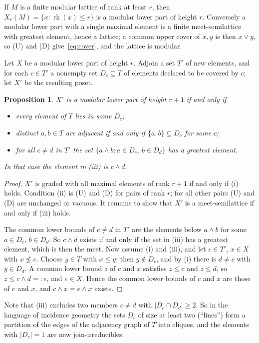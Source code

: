\documentclass[11pt]{amsart}
\newtheorem{proposition}[theorem]{Proposition}
\theoremstyle{definition}
\theoremstyle{remark}
\newcommand{\rk}{\operatorname{rk}}
\begin{document}
If $M$ is a finite modular lattice of rank at least $r$, then
$X_r(M) = \{x : \rk(x) \le r\}$ is a modular lower part of height $r$.  Conversely a modular lower part
with a single maximal element is a finite meet-semilattice with greatest element, hence a
lattice; a common upper cover of $x,y$ is then $x \vee y$, so (U) and (D)
give~\eqref{eq:cover}, and the lattice is modular.

Let $X$ be a modular lower part of height $r$.  Adjoin a set $T'$ of new elements, and
for each $c \in T'$ a nonempty set $D_c \subseteq T$ of elements declared to be covered
by $c$; let $X'$ be the resulting poset.

\begin{proposition}\label{prop:layer}
$X'$ is a modular lower part of height $r+1$ if and only if
\begin{itemize}
\item[(i)] every element of $T$ lies in some $D_c$;
\item[(ii)] distinct $a,b \in T$ are adjacent if and only if $\{a,b\} \subseteq D_c$ for some $c$;
\item[(iii)] for all $c \ne d$ in $T'$ the set
  $\{a \wedge b : a \in D_c,\ b \in D_d\}$ has a greatest element.
\end{itemize}
In that case the element in \textup{(iii)} is $c \wedge d$.
\end{proposition}

\begin{proof}
$X'$ is graded with all maximal elements of rank $r+1$ if and only if (i) holds.
Condition (ii) is (U) and (D) for pairs of rank $r$; for all other pairs (U) and (D) are
unchanged or vacuous.  It remains to show that $X'$ is a meet-semilattice if and only if
(iii) holds.

The common lower bounds of $c \ne d$ in $T'$ are the elements below $a \wedge b$ for
some $a \in D_c$, $b \in D_d$.  So $c \wedge d$ exists if and only if the set in (iii)
has a greatest element, which is then the meet.  Now assume (i) and (iii), and let
$c \in T'$, $x \in X$ with $x \not\le c$.  Choose $y \in T$ with $x \le y$; then
$y \notin D_c$, and by (i) there is $d \ne c$ with $y \in D_d$.  A common lower
bound $z$ of $c$ and $x$ satisfies $z \le c$ and $z \le d$, so $z \le c \wedge d =: e$,
and $e \in X$.  Hence the common lower bounds of $c$ and $x$ are those of $e$ and $x$,
and $c \wedge x = e \wedge x$ exists.
\end{proof}

Note that (iii) excludes two members $c \ne d$ with $|D_c \cap D_d| \ge 2$.  So in the
language of incidence geometry the sets $D_c$ of size at least two (``lines'') form a
partition of the edges of the adjacency graph of $T$ into cliques, and the elements with
$|D_c| = 1$ are new join-irreducibles.
\end{document}
